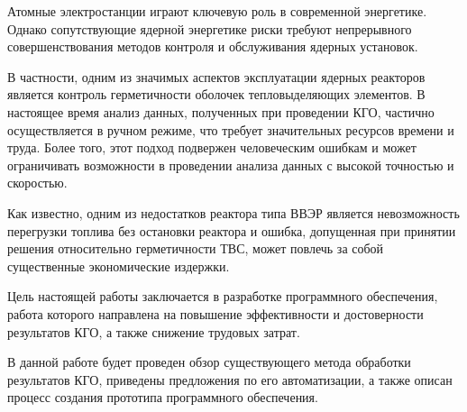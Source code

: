 
Атомные электростанции играют ключевую роль в современной
энергетике. Однако сопутствующие ядерной энергетике риски требуют
непрерывного совершенствования методов контроля и обслуживания ядерных установок.

В частности, одним из значимых аспектов эксплуатации ядерных реакторов является контроль герметичности оболочек тепловыделяющих
элементов. В настоящее время анализ данных, полученных при проведении
КГО, частично осуществляется в ручном режиме, что требует значительных ресурсов времени и труда. Более того, этот подход подвержен человеческим ошибкам и может ограничивать возможности в проведении анализа данных с высокой точностью и скоростью.

Как известно, одним из недостатков реактора типа ВВЭР является
невозможность перегрузки топлива без остановки реактора и ошибка,
допущенная при принятии решения относительно герметичности ТВС, может повлечь за собой существенные экономические издержки.

Цель настоящей работы заключается в разработке программного обеспечения, работа которого направлена на повышение эффективности
и достоверности результатов КГО, а также снижение трудовых затрат.

В данной работе будет проведен обзор существующего метода обработки результатов КГО, приведены предложения по его автоматизации, а также описан процесс создания прототипа программного обеспечения.
